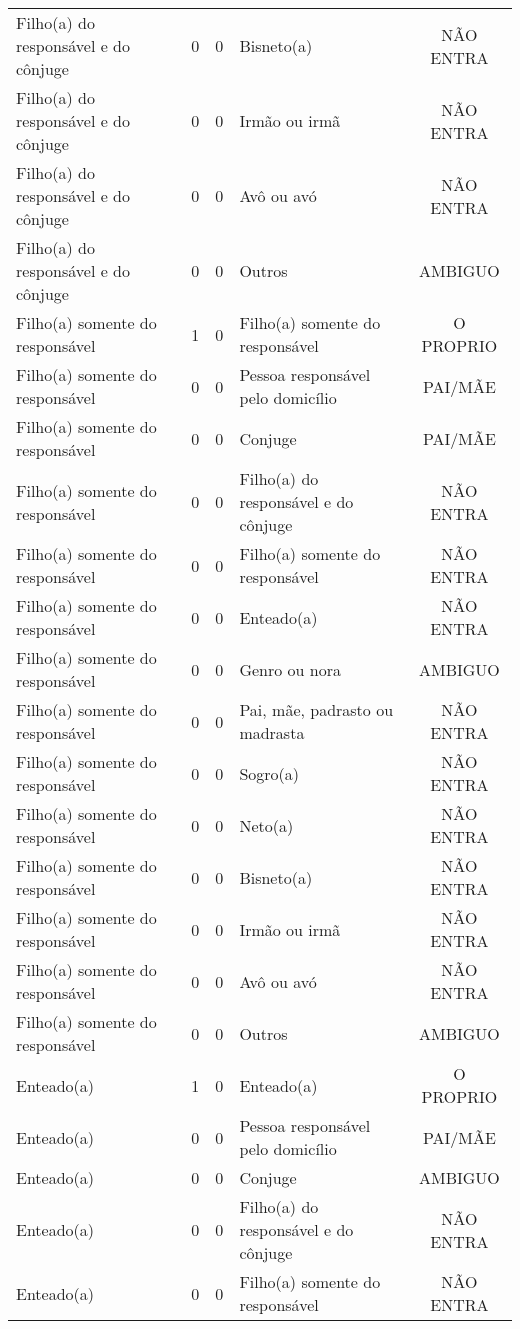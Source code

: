 \documentclass[
	12pt,				%
	openright,			%
	twoside,			%
	a4paper,			%
	english,			%
	french,				%
	spanish,			%
	brazil				%
	]{abntex2}
\begin{document}
\begin{anexosenv}
\begin{longtable}{@{}lcclc@{}}
				Filho(a) do responsável e do cônjuge & 0 & 0 & Bisneto(a) & NÃO ENTRA \\
				Filho(a) do responsável e do cônjuge & 0 & 0 & Irmão ou irmã & NÃO ENTRA \\
				Filho(a) do responsável e do cônjuge & 0 & 0 & Avô ou avó & NÃO ENTRA \\
				Filho(a) do responsável e do cônjuge & 0 & 0 & Outros & AMBIGUO \\
				Filho(a) somente do responsável & 1 & 0 & Filho(a) somente do responsável & O PROPRIO \\
				Filho(a) somente do responsável & 0 & 0 & Pessoa responsável pelo domicílio & PAI/MÃE \\
				Filho(a) somente do responsável & 0 & 0 & Conjuge & PAI/MÃE \\
				Filho(a) somente do responsável & 0 & 0 & Filho(a) do responsável e do cônjuge & NÃO ENTRA \\
				Filho(a) somente do responsável & 0 & 0 & Filho(a) somente do responsável & NÃO ENTRA \\
				Filho(a) somente do responsável & 0 & 0 & Enteado(a) & NÃO ENTRA \\
				Filho(a) somente do responsável & 0 & 0 & Genro ou nora & AMBIGUO \\
				Filho(a) somente do responsável & 0 & 0 & Pai, mãe, padrasto ou madrasta & NÃO ENTRA \\
				Filho(a) somente do responsável & 0 & 0 & Sogro(a) & NÃO ENTRA \\
				Filho(a) somente do responsável & 0 & 0 & Neto(a) & NÃO ENTRA \\
				Filho(a) somente do responsável & 0 & 0 & Bisneto(a) & NÃO ENTRA \\
				Filho(a) somente do responsável & 0 & 0 & Irmão ou irmã & NÃO ENTRA \\
				Filho(a) somente do responsável & 0 & 0 & Avô ou avó & NÃO ENTRA \\
				Filho(a) somente do responsável & 0 & 0 & Outros & AMBIGUO \\
				Enteado(a) & 1 & 0 & Enteado(a) & O PROPRIO \\
				Enteado(a) & 0 & 0 & Pessoa responsável pelo domicílio & PAI/MÃE \\
				Enteado(a) & 0 & 0 & Conjuge & AMBIGUO \\
				Enteado(a) & 0 & 0 & Filho(a) do responsável e do cônjuge & NÃO ENTRA \\
				Enteado(a) & 0 & 0 & Filho(a) somente do responsável & NÃO ENTRA \\

\end{longtable}
\end{anexosenv}
\end{document}
